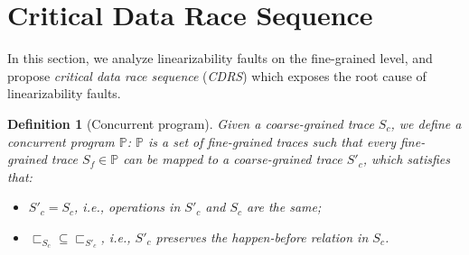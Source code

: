 \documentclass[runningheads]{llncs}
\newcommand{\p}{\mathbb{P} }
\newcommand{\ft}{S_f}
\newcommand{\ct}{S_c}
\newtheorem{myDef}{Definition}
\begin{document}
\vspace{-0.2cm}
\section{Critical Data Race Sequence}\label{sec:criticaldataraces}



In this section, we analyze linearizability faults on the fine-grained level, and propose \textit{critical data race sequence} (\textit{CDRS}) which exposes the root cause of linearizability faults.



\begin{myDef}[Concurrent program]\label{def:concurrentprogram}
Given a coarse-grained trace $\ct$, we define a concurrent program $\p$:
$\p$ 
 is a set of fine-grained traces such that
every fine-grained trace $\ft \in \p$ can be mapped to a coarse-grained trace $S'_c$, which satisfies that: 
\begin{itemize}
  \item $S'_c = S_c$, i.e., operations in $S'_c$ and $S_c$ are the same;
  \item $\sqsubset_{S_c}\subseteq \sqsubset_{S'_c}$, i.e., $S'_c$ preserves the \textit{happen-before} relation in $S_c$.
\end{itemize}
\end{myDef}
\end{document}
